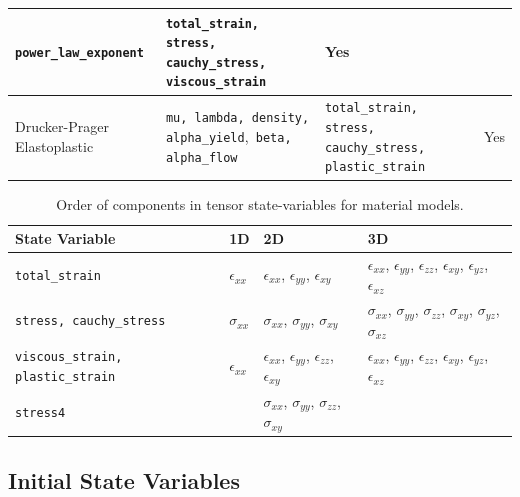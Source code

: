 \begin{center}
\begin{table}[H]
\begin{tabular}{|>{\centering}p{1.5in}|>{\centering}p{1.8in}|>{\centering}p{1.5in}|>{\centering}p{1in}|}
\texttt{power\_law\_exponent} & \texttt{total\_strain, stress, cauchy\_stress, viscous\_strain} & Yes\tabularnewline
\hline 
Drucker-Prager Elastoplastic & \texttt{mu, lambda, density, alpha\_yield},\texttt{ beta, alpha\_flow } & \texttt{total\_strain, stress, cauchy\_stress, plastic\_strain} & Yes\tabularnewline
\hline 
\end{tabular}
\end{table}
\begin{table}[H]
\centering{}\caption{\label{tab:materials:statevars}Order of components in tensor
state-variables for material models.}
\begin{tabular}{|>{\centering}p{1.25in}|>{\centering}p{0.5in}|>{\centering}p{1.25in}|>{\centering}p{2.25in}|}
\hline 
\textbf{State Variable} & \textbf{1D} & \textbf{2D} & \textbf{3D}\tabularnewline
\hline 
\hline 
\texttt{total\_strain} & $\epsilon_{xx}$ & $\epsilon_{xx}$, $\epsilon_{yy}$, $\epsilon_{xy}$ & $\epsilon_{xx}$, $\epsilon_{yy}$, $\epsilon_{zz}$, $\epsilon_{xy}$,
$\epsilon_{yz}$, $\epsilon_{xz}$\tabularnewline
\hline 
\texttt{stress, cauchy\_stress} & $\sigma_{xx}$ & $\sigma_{xx}$, $\sigma_{yy}$, $\sigma_{xy}$ & $\sigma_{xx}$, $\sigma_{yy}$, $\sigma_{zz}$, $\sigma_{xy}$, $\sigma_{yz}$,
$\sigma_{xz}$\tabularnewline
\hline 
\texttt{viscous\_strain, plastic\_strain} & $\epsilon_{xx}$ & $\epsilon_{xx}$, $\epsilon_{yy}$, $\epsilon_{zz}$, $\epsilon_{xy}$ & $\epsilon_{xx}$, $\epsilon_{yy}$, $\epsilon_{zz}$, $\epsilon_{xy}$,
$\epsilon_{yz}$, $\epsilon_{xz}$\tabularnewline
\hline 
\texttt{stress4} &  & $\sigma_{xx}$, $\sigma_{yy}$, $\sigma_{zz}$, $\sigma_{xy}$ & \tabularnewline
\hline 
\end{tabular}
\end{table}

\par\end{center}


\subsection{\label{sec:Initial-State-Variables}Initial State Variables}

